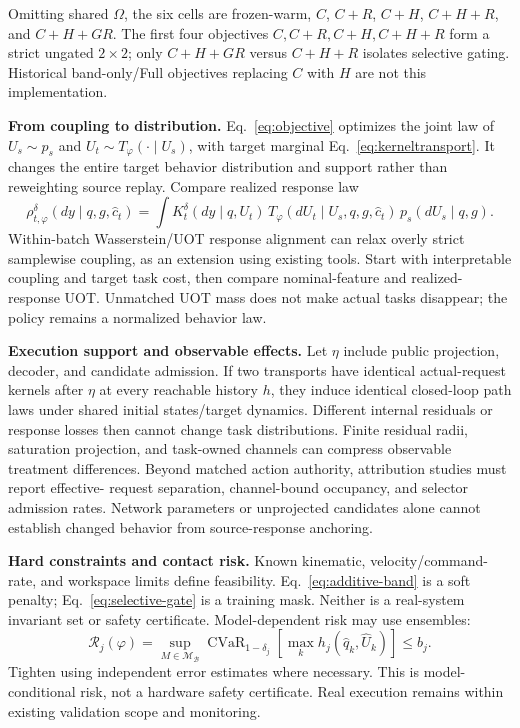 \documentclass[11pt]{article}
\begin{document}
Omitting shared $\Omega$, the six cells are frozen-warm, $C$, $C+R$, $C+H$, $C+H+R$,
and $C+H+G R$. The first four objectives $C,C+R,C+H,C+H+R$ form a strict ungated
$2\times2$; only $C+H+G R$ versus $C+H+R$ isolates selective gating. Historical
band-only/Full objectives replacing $C$ with $H$ are not this implementation.

\textbf{From coupling to distribution.} Eq.~\eqref{eq:objective} optimizes the joint
law of $U_s\sim p_s$ and $U_t\sim T_\varphi(\cdot\mid U_s)$, with target marginal
Eq.~\eqref{eq:kerneltransport}. It changes the entire target behavior distribution
and support rather than reweighting source replay. Compare realized response law
\begin{equation}
 \rho_{t,\varphi}^{\delta}(dy\mid q,g,\hat c_t)
 =\int K_t^\delta(dy\mid q,U_t)\,
 T_\varphi(dU_t\mid U_s,q,g,\hat c_t)\,p_s(dU_s\mid q,g).
 \label{eq:responselaw}
\end{equation}
Within-batch Wasserstein/UOT response alignment can relax overly strict samplewise
coupling, as an extension using existing tools. Start with interpretable coupling
and target task cost, then compare nominal-feature and realized-response UOT.
Unmatched UOT mass does not make actual tasks disappear; the policy remains a normalized
behavior law.

\textbf{Execution support and observable effects.} Let $\eta$ include public projection,
decoder, and candidate admission. If two transports have identical actual-request
kernels after $\eta$ at every reachable history $h$, they induce identical closed-loop
path laws under shared initial states/target dynamics. Different internal residuals
or response losses then cannot change task distributions. Finite residual radii,
saturation projection, and task-owned channels can compress observable treatment
differences. Beyond matched action authority, attribution studies must report effective-
request separation, channel-bound occupancy, and selector admission rates. Network
parameters or unprojected candidates alone cannot establish changed behavior from
source-response anchoring.

\textbf{Hard constraints and contact risk.} Known kinematic, velocity/command-rate,
and workspace limits define feasibility. Eq.~\eqref{eq:additive-band} is a soft penalty;
Eq.~\eqref{eq:selective-gate} is a training mask. Neither is a real-system invariant
set or safety certificate. Model-dependent risk may use ensembles:
\begin{equation}
 \mathcal R_j(\varphi)=
 \sup_{M\in\mathcal M_{\mathcal B}}
 \operatorname{CVaR}_{1-\delta_j}
 \left[\max_k h_j(\hat q_k,\hat U_k)\right]\le b_j.
 \label{eq:risk}
\end{equation}
Tighten using independent error estimates where necessary. This is model-conditional
risk, not a hardware safety certificate. Real execution remains within existing
validation scope and monitoring.
\end{document}
